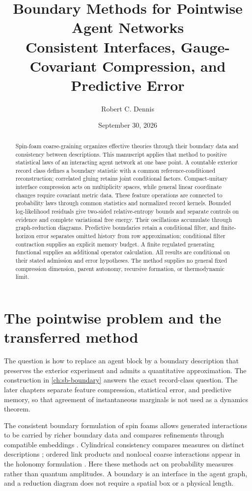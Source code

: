 \documentclass[11pt,letterpaper]{report}
\title{Boundary Methods for Pointwise Agent Networks\\
\large Consistent Interfaces, Gauge-Covariant Compression, and Predictive Error}
\author{Robert C. Dennis}
\date{September 30, 2026}
\begin{document}
\hypersetup{pageanchor=false}
\maketitle
\begin{abstract}
Spin-foam coarse-graining organizes effective theories through their boundary data and consistency between descriptions. This manuscript applies that method to positive statistical laws of an interacting agent network at one base point. A countable exterior record class defines a boundary statistic with a common reference-conditioned reconstruction; correlated gluing retains joint conditional factors. Compact-unitary interface compression acts on multiplicity spaces, while general linear coordinate changes require covariant metric data. These feature operations are connected to probability laws through common statistics and normalized record kernels. Bounded log-likelihood residuals give two-sided relative-entropy bounds and separate controls on evidence and complete variational free energy. Their oscillations accumulate through graph-reduction diagrams. Predictive boundaries retain a conditional filter, and finite-horizon error separates omitted history from row approximation; conditional filter contraction supplies an explicit memory budget. A finite regulated generating functional supplies an additional operator calculation. All results are conditional on their stated admission and error hypotheses. The method supplies no general fixed compression dimension, parent autonomy, recursive formation, or thermodynamic limit.
\end{abstract}
\tableofcontents
\clearpage
{}
\hypersetup{pageanchor=true}
\chapter{The pointwise problem and the transferred method}
\label{ch:sb-setup}
The question is how to replace an agent block by a boundary description that preserves the exterior experiment and admits a quantitative approximation. The construction in \cref{ch:sb-boundary} answers the exact record-class question. The later chapters separate feature compression, statistical error, and predictive memory, so that agreement of instantaneous marginals is not used as a dynamics theorem.

The consistent boundary formulation of spin foams allows generated interactions to be carried by richer boundary data and compares refinements through compatible embeddings \cite[Sec.~5, Eqs.~(13)--(19)]{asante-2022-spin-foams-refinement-renormalization}. Cylindrical consistency compares measures on distinct descriptions \cite[Sec.~2, Eq.~(2.8)]{bahr-2014-background-independent-renormalization}; ordered link products and nonlocal coarse interactions appear in the holonomy formulation \cite[Sec.~4, Eqs.~(4.1)--(4.3)]{bahr-2011-operator-spin-foams}. Here these methods act on probability measures rather than quantum amplitudes. A boundary is an interface in the agent graph, and a reduction diagram does not require a spatial box or a physical length.
\end{document}
